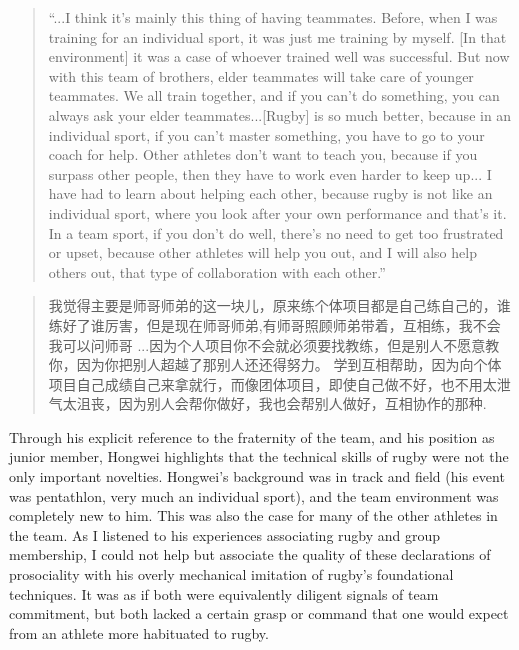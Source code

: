 \begin{CJK}{UTF8}{gbsn}
  \begin{quotation}
    ``...I think it's mainly this thing of having teammates. Before, when I was training for an individual sport, it was just me training by myself. [In that environment] it was a case of whoever trained well was successful.  But now with this team of brothers, elder teammates will take care of younger teammates. We all train together, and if you can’t do something, you can always ask your elder teammates...[Rugby] is so much better, because in an individual sport, if you can't master something, you have to go to your coach for help. Other athletes don't want to teach you, because if you surpass other people, then they have to work even harder to keep up... I have had to learn about helping each other, because rugby is not like an individual sport, where you look after your own performance and that's it.  In a team sport, if you don't do well, there's no need to get too frustrated or upset, because other athletes will help you out, and I will also help others out, that type of collaboration with each other.''
  \end{quotation}

\begin{CJK}{UTF8}{gbsn}
  \begin{quotation}
    我觉得主要是师哥师弟的这一块儿，原来练个体项目都是自己练自己的，谁练好了谁厉害，但是现在师哥师弟,有师哥照顾师弟带着，互相练，我不会我可以问师哥
    ...因为个人项目你不会就必须要找教练，但是别人不愿意教你，因为你把别人超越了那别人还还得努力。 学到互相帮助，因为向个体项目自己成绩自己来拿就行，而像团体项目，即使自己做不好，也不用太泄气太沮丧，因为别人会帮你做好，我也会帮别人做好，互相协作的那种.
  \end{quotation}
\end{CJK}

Through his explicit reference to the fraternity of the team, and his position as junior member, Hongwei highlights that the technical skills of rugby were not the only important novelties.  Hongwei's background was in track and field (his event was pentathlon, very much an individual sport), and the team environment was completely new to him.  This was also the case for many of the other athletes in the team.  As I listened to his experiences associating rugby and group membership, I could not help but associate the quality of these declarations of prosociality with his overly mechanical imitation of rugby's foundational techniques.  It was as if both were equivalently diligent signals of team commitment, but both lacked a certain grasp or command that one would expect from an athlete more habituated to rugby.


\end{CJK}
